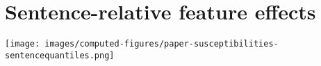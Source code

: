 \section{Sentence-relative feature effects}

\begin{figure*}[!th]
    \centering
    \texttt{[image: images/computed-figures/paper-susceptibilities-sentencequantiles.png]}
    \caption{}
    \label{fig:feature-susceptibilities-in_sentence}
\end{figure*}